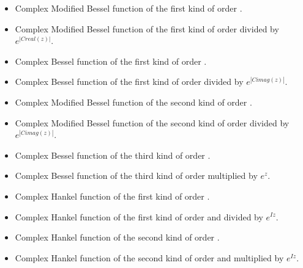 \begin{itemize}
\item {}
  \sshortdescribe  Complex Modified Bessel function of the first
  kind of order .
\item {}
  \sshortdescribe  Complex Modified Bessel function of the first
  kind of order  divided by $e^{|Creal(z)|}$.
\item {}
  \sshortdescribe  Complex  Bessel function of the first
  kind of order .
\item {}
  \sshortdescribe  Complex  Bessel function of the first
  kind of order  divided by $e^{|Cimag(z)|}$.
\item {}
  \sshortdescribe  Complex Modified Bessel function of the second
  kind of order .
\item {}
  \sshortdescribe  Complex Modified Bessel function of the second
  kind of order  divided by $e^{|Cimag(z)|}$.
\item {}
  \sshortdescribe  Complex Bessel function of the third
  kind of order .
\item {}
  \sshortdescribe  Complex Bessel function of the third
  kind of order  multiplied by $e^{z}$.
\item {}
  \sshortdescribe  Complex Hankel function of the first kind of
  order . 
\item {}
  \sshortdescribe  Complex  Hankel function of the first kind of order
    and divided by $e^{I z}$.
\item {}
  \sshortdescribe  Complex  Hankel function of the second kind of
  order . 
\item {}
  \sshortdescribe  Complex  Hankel function of the second kind of
  order   and multiplied by $e^{I z}$.
\end{itemize}

